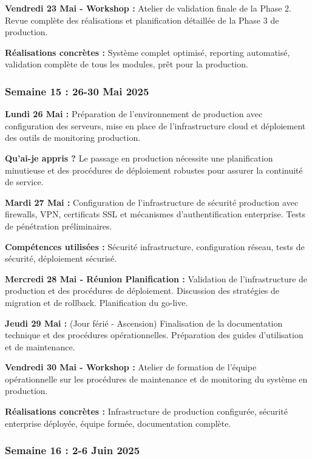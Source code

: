 \documentclass[a4paper,12pt]{article}
\begin{document}
\textbf{Vendredi 23 Mai - Workshop :}
Atelier de validation finale de la Phase 2. Revue complète des réalisations et planification détaillée de la Phase 3 de production.

\textbf{Réalisations concrètes :} Système complet optimisé, reporting automatisé, validation complète de tous les modules, prêt pour la production.

\subsubsection{Semaine 15 : 26-30 Mai 2025}

\textbf{Lundi 26 Mai :}
Préparation de l'environnement de production avec configuration des serveurs, mise en place de l'infrastructure cloud et déploiement des outils de monitoring production.

\textbf{Qu'ai-je appris ?} Le passage en production nécessite une planification minutieuse et des procédures de déploiement robustes pour assurer la continuité de service.

\textbf{Mardi 27 Mai :}
Configuration de l'infrastructure de sécurité production avec firewalls, VPN, certificats SSL et mécanismes d'authentification enterprise. Tests de pénétration préliminaires.

\textbf{Compétences utilisées :} Sécurité infrastructure, configuration réseau, tests de sécurité, déploiement sécurisé.

\textbf{Mercredi 28 Mai - Réunion Planification :}
Validation de l'infrastructure de production et des procédures de déploiement. Discussion des stratégies de migration et de rollback. Planification du go-live.

\textbf{Jeudi 29 Mai :} (Jour férié - Ascension)
Finalisation de la documentation technique et des procédures opérationnelles. Préparation des guides d'utilisation et de maintenance.

\textbf{Vendredi 30 Mai - Workshop :}
Atelier de formation de l'équipe opérationnelle sur les procédures de maintenance et de monitoring du système en production.

\textbf{Réalisations concrètes :} Infrastructure de production configurée, sécurité enterprise déployée, équipe formée, documentation complète.

\subsubsection{Semaine 16 : 2-6 Juin 2025}
\end{document}
